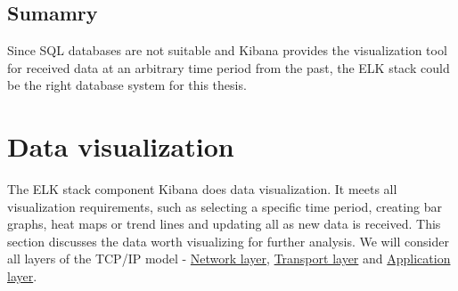 \documentclass[12pt,a4paper,twoside]{book}
\begin{document}
        \subsection{Sumamry} \label{analysis:storage:conclusion}
            Since SQL databases are not suitable and Kibana provides the visualization tool for received data at an arbitrary time period from the past, the ELK stack could be the right database system for this thesis.
    \section{Data visualization} \label{analysis:data}
        The ELK stack component Kibana does data visualization. It meets all visualization requirements, such as selecting a specific time period, creating bar graphs, heat maps or trend lines and updating all as new data is received. This section discusses the data worth visualizing for further analysis. We will consider all layers of the TCP/IP model - \hyperref[analysis:data:network]{Network layer}, \hyperref[analysis:data:transport]{Transport layer} and \hyperref[analysis:data:application]{Application layer}.
\end{document}
